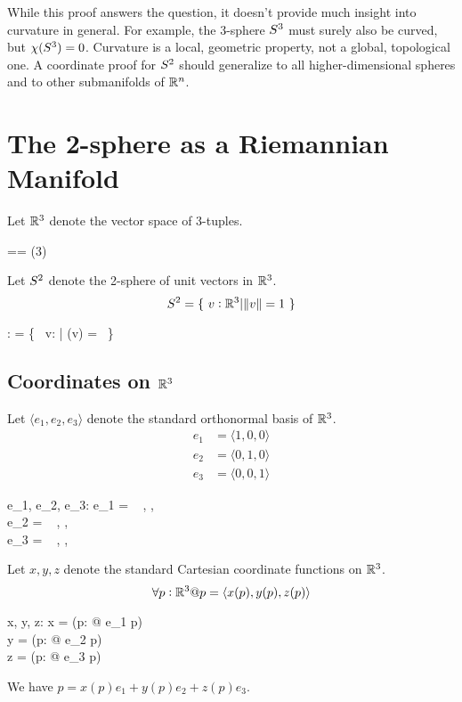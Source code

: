 \documentclass[11pt, oneside]{article}
\begin{document}
While this proof answers the question, it doesn't provide much insight into curvature in general.
For example, the 3-sphere $S^3$ must surely also be curved, but $\chi(S^3) = 0$.
Curvature is a local, geometric property, not a global, topological one.
A coordinate proof for $S^2$ should generalize to all higher-dimensional spheres and to other submanifolds of $\mathbb{R}^n$.

\section{The 2-sphere as a Riemannian Manifold}

Let $\mathbb{R}^3$ denote the vector space of 3-tuples.
\begin{zed}
	\Rthree == \Rtuples(3)
\end{zed}

Let $S^2$ denote the 2-sphere of unit vectors in $\mathbb{R}^3$.
\begin{equation}
	S^2 = \{~ v: \mathbb{R}^3 | \norm{v} = 1 ~\}
\end{equation}

\begin{axdef}
	\Stwo: \power \Rthree
\where
	\Stwo = \{~ v: \Rthree | \normR(v) = \oneR ~\}
\end{axdef}

\subsection{Coordinates on $\mathbb{R}^3$}

Let $\langle e_1, e_2, e_3 \rangle$ denote the standard orthonormal basis of $\mathbb{R}^3$.
\begin{align}
e_1 & = \langle1, 0, 0 \rangle \\
e_2 & = \langle 0, 1, 0 \rangle \\
e_3 & = \langle 0, 0, 1 \rangle
\end{align}
\begin{axdef}
	e_1, e_2, e_3: \Rthree
\where
	e_1 = \langle~ \oneR, \zeroR, \zeroR ~\rangle \\
	e_2 = \langle~ \zeroR, \oneR, \zeroR ~\rangle \\
	e_3 = \langle~ \zeroR, \zeroR, \oneR ~\rangle
\end{axdef}

Let $x, y, z$ denote the standard Cartesian coordinate functions on $\mathbb{R}^3$.
\begin{equation}
\forall p : \mathbb{R}^3 @ p = \langle x(p), y(p), z(p) \rangle
\end{equation}
\begin{axdef}
	x, y, z: \Rthree \fun \R
\where
	x = (\lambda p: \Rthree @ e_1 \dotR p) \\
	y = (\lambda p: \Rthree @ e_2 \dotR p) \\
	z = (\lambda p: \Rthree @ e_3 \dotR p)
\end{axdef}
\begin{remark}
We have $p = x(p) e_1 + y(p) e_2 + z(p) e_3$.
\end{remark}
\end{document}
